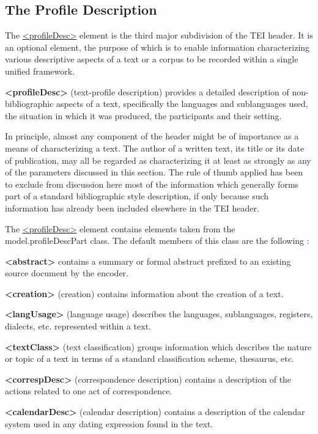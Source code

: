 \subsection[{The Profile Description}]{The Profile Description}\label{HD4}\par
The \hyperref[TEI.profileDesc]{<profileDesc>} element is the third major subdivision of the TEI header. It is an optional element, the purpose of which is to enable information characterizing various descriptive aspects of a text or a corpus to be recorded within a single unified framework. 
\begin{sansreflist}
  
\item [\textbf{<profileDesc>}] (text-profile description) provides a detailed description of non-bibliographic aspects of a text, specifically the languages and sublanguages used, the situation in which it was produced, the participants and their setting.
\end{sansreflist}
 In principle, almost any component of the header might be of importance as a means of characterizing a text. The author of a written text, its title or its date of publication, may all be regarded as characterizing it at least as strongly as any of the parameters discussed in this section. The rule of thumb applied has been to exclude from discussion here most of the information which generally forms part of a standard bibliographic style description, if only because such information has already been included elsewhere in the TEI header.\par
The \hyperref[TEI.profileDesc]{<profileDesc>} element contains elements taken from the \textsf{model.profileDescPart} class. The default members of this class are the following : 
\begin{sansreflist}
  
\item [\textbf{<abstract>}] contains a summary or formal abstract prefixed to an existing source document by the encoder.
\item [\textbf{<creation>}] (creation) contains information about the creation of a text.
\item [\textbf{<langUsage>}] (language usage) describes the languages, sublanguages, registers, dialects, etc. represented within a text.
\item [\textbf{<textClass>}] (text classification) groups information which describes the nature or topic of a text in terms of a standard classification scheme, thesaurus, etc.
\item [\textbf{<correspDesc>}] (correspondence description) contains a description of the actions related to one act of correspondence.
\item [\textbf{<calendarDesc>}] (calendar description) contains a description of the calendar system used in any dating expression found in the text.
\end{sansreflist}
